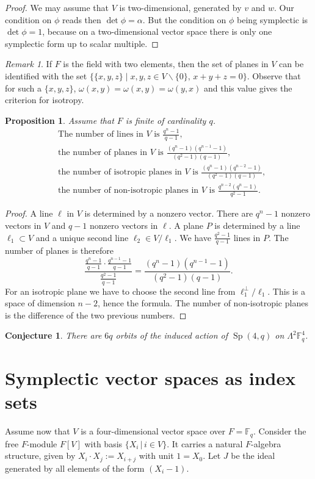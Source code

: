 \documentclass{amsart}
\DeclareMathOperator{\Sp}{Sp}
\theoremstyle{plain}
\newtheorem{proposition}[theorem]{Proposition}
\newtheorem{conjecture}[theorem]{Conjecture}
\theoremstyle{definition}
\theoremstyle{remark}
\newtheorem{remark}[theorem]{Remark}
\begin{document}
\begin{proof}
We may assume that $V$ is two-dimensional, generated by $v$ and $w$. Our condition on $\phi$ reads then $\det\phi = \alpha$. But the condition on $\phi$ being symplectic is $\det\phi = 1$, because on a two-dimensional vector space there is only one symplectic form up to scalar multiple. 
\end{proof}
\begin{remark}
 If $F$ is the field with two elements, then the set of planes in $V$ can be identified with the set $\{\{x,y,z\}\;|\;x,y,z\in V\backslash\{0\},\,x+y+z=0\}$. Observe that for such a $\{x,y,z\}$, $\omega(x,y)=\omega(x,y)=\omega(y,x)$ and this value gives the criterion for isotropy.
\end{remark}

\begin{proposition} Assume that $F$ is finite of cardinality $q$.
\begin{align}
&\text{The number of lines in $V$ is }\frac{q^n-1}{q-1}, \\
&\text{the number of planes in $V$ is }\frac{(q^n-1)(q^{n-1}-1)}{(q^2-1)(q-1)}, \\
&\text{the number of isotropic planes in $V$ is }\frac{(q^n-1)(q^{n-2}-1)}{(q^2-1)(q-1)}, \\
&\text{the number of non-isotropic planes in $V$ is }\frac{q^{n-2}(q^n-1)}{q^2-1}.
\end{align}
\end{proposition}
\begin{proof}
A line $\ell$ in $V$ is determined by a nonzero vector. There are $q^n - 1$ nonzero vectors in $V$ and $q-1$ nonzero vectors in $\ell$. A plane $P$ is determined by a line $\ell_1 \subset V$ and a unique second line $\ell_2\in V/\ell_1$. We have $\frac{q^2-1}{q-1}$ lines in $P$. The number of planes is therefore
$$
\frac{ \frac{q^n-1}{q-1} \cdot\frac{q^{n-1}-1}{q-1}}{\frac{q^2-1}{q-1} } = \frac{(q^n-1)(q^{n-1}-1)}{(q^2-1)(q-1)}.
$$
For an isotropic plane we have to choose the second line from $\ell_1^\perp/\ell_1$. This is a space of dimension $n-2$, hence the formula. The number of non-isotropic planes is the difference of the two previous numbers.
\end{proof}
\begin{conjecture}
There are $6q$ orbits of the induced action of $\Sp(4,q)$ on $\Lambda^2 \mathbb{F}_q^4$.
\end{conjecture}

\section{Symplectic vector spaces as index sets}
Assume now that $V$ is a four-dimensional vector space over $F=\mathbb F_q$. Consider the free $F$-module $F[V]$ with basis $\{X_i \,|\, i\in V\}$. It carries a natural $F$-algebra structure, given by
$X_i\cdot X_j := X_{i+j}$ with unit $1=X_0$. Let $J$ be the ideal generated by all elements of the form $(X_i-1)$.
\end{document}
